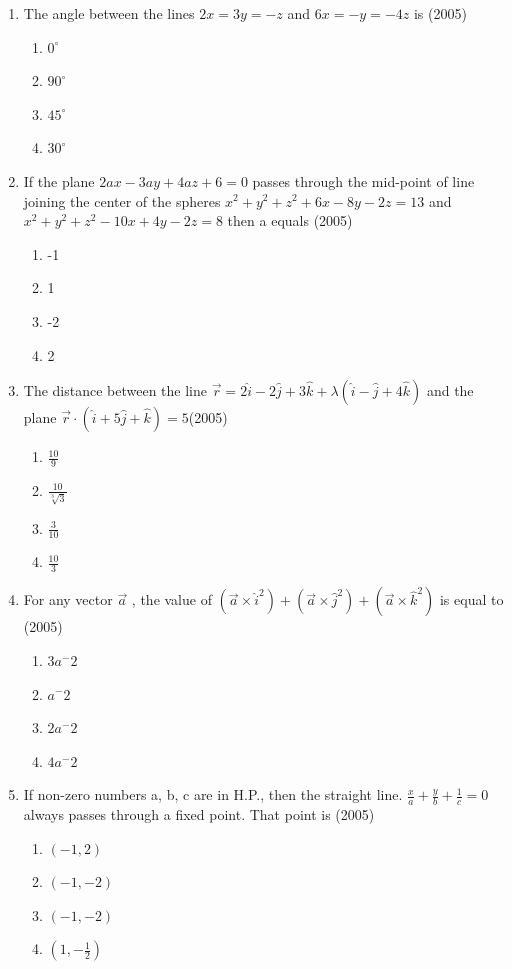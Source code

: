 \documentclass[12pt]{article}
\providecommand{\brak}[1]{\ensuremath{\left(#1\right)}}
\begin{document}
\begin{enumerate}
\item The angle between the lines $2x=3y=-z$ and $6x=-y=-4z$ is (2005)
\begin{enumerate}
\item $0^\circ$
\item $90^\circ$
\item $45^\circ$
\item $30^\circ$
\end{enumerate}
\item If the plane $2ax-3ay+4az+6=0$ passes through the mid-point of line joining the center of the spheres $x^2+y^2+z^2+6x-8y-2z=13$ and $x^2+y^2+z^2-10x+4y-2z=8$ then a equals (2005)
\begin{enumerate}
\item -1
\item 1
\item -2 
\item 2
\end{enumerate}
\item The distance between the line $\vec{r}=2\hat{i}-2\hat{j}+3\hat{k}+\lambda\brak{\hat{i}-\hat{j}+4\hat{k}}$ and the plane $\vec{r}\cdot\brak{\hat{i}+5\hat{j}+\hat{k}}=5$(2005)
\begin{enumerate}
\item $\frac{10}{9}$
\item $\frac{10}{\sqrt[3]{3}}$
\item $\frac{3}{10}$
\item $\frac{10}{3}$
\end{enumerate}
\item For any vector $\vec{a}$ , the value of $\brak{\vec{a}\times\hat{i}^2}+\brak{\vec{a}\times\hat{j}^2}+\brak{\vec{a}\times\hat{k}^2}$ is equal to (2005)
\begin{enumerate}
\item $3a^-2$
\item $a^-2$
\item $2a^-2$
\item $4a^-2$
\end{enumerate}
\item If non-zero numbers a, b, c are in H.P., then the straight line. $\frac{x}{a}+\frac{y}{b}+\frac{1}{c}=0$ always passes through a fixed point. That point is (2005)
\begin{enumerate}
\item $(-1,2)$
\item $(-1,-2)$
\item $(-1,-2)$
\item $(1,-\frac{1}{2})$
\end{enumerate}

\end{enumerate}
\end{document}
